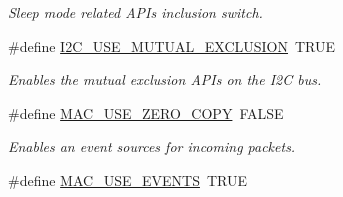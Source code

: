 \begin{DoxyCompactItemize}
\begin{DoxyCompactList}\small\item\em Sleep mode related A\+P\+Is inclusion switch. \end{DoxyCompactList}\item 
\hypertarget{group__HAL__CONF_ga7125642404a6fd3d4985d1cb6e1b7b0a}{\#define \hyperlink{group__HAL__CONF_ga7125642404a6fd3d4985d1cb6e1b7b0a}{I2\+C\+\_\+\+U\+S\+E\+\_\+\+M\+U\+T\+U\+A\+L\+\_\+\+E\+X\+C\+L\+U\+S\+I\+O\+N}~T\+R\+U\+E}\label{group__HAL__CONF_ga7125642404a6fd3d4985d1cb6e1b7b0a}

\begin{DoxyCompactList}\small\item\em Enables the mutual exclusion A\+P\+Is on the I2\+C bus. \end{DoxyCompactList}\item 
\hypertarget{group__HAL__CONF_gad763d9426413cf2fe3922ebb8578bc59}{\#define \hyperlink{group__HAL__CONF_gad763d9426413cf2fe3922ebb8578bc59}{M\+A\+C\+\_\+\+U\+S\+E\+\_\+\+Z\+E\+R\+O\+\_\+\+C\+O\+P\+Y}~F\+A\+L\+S\+E}\label{group__HAL__CONF_gad763d9426413cf2fe3922ebb8578bc59}

\begin{DoxyCompactList}\small\item\em Enables an event sources for incoming packets. \end{DoxyCompactList}\item 
\hypertarget{group__HAL__CONF_ga887da1c1383a9e7b45c4464877a7e05e}{\#define \hyperlink{group__HAL__CONF_ga887da1c1383a9e7b45c4464877a7e05e}{M\+A\+C\+\_\+\+U\+S\+E\+\_\+\+E\+V\+E\+N\+T\+S}~T\+R\+U\+E}\label{group__HAL__CONF_ga887da1c1383a9e7b45c4464877a7e05e}


\end{DoxyCompactItemize}
